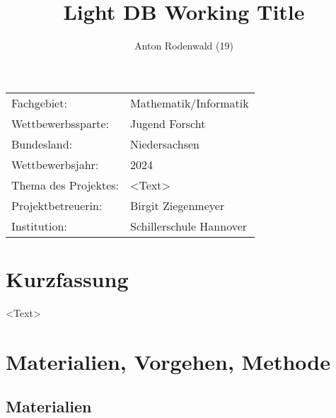 \documentclass[11pt,a4paper]{article}
\begin{document}
\title{Light DB Working Title}
\author{Anton Rodenwald (19)}
\maketitle

\addtocounter{page}{-2}
\pagestyle{empty}

\large
\begin{tabular}{l p{12cm}}

    Fachgebiet:          & Mathematik/Informatik   \\

    Wettbewerbssparte:   & Jugend Forscht          \\

    Bundesland:          & Niedersachsen           \\

    Wettbewerbsjahr:     & 2024                    \\

    Thema des Projektes: & <Text>                  \\

    Projektbetreuerin:   & Birgit Ziegenmeyer      \\

    Institution:         & Schillerschule Hannover \\
\end{tabular}

\clearpage

\section*{Kurzfassung}

<Text>

\clearpage

\renewcommand*\contentsname{Inhaltsverzeichnis}

\tableofcontents



\section{Materialien, Vorgehen, Methode}

\subsection{Materialien}
\end{document}
